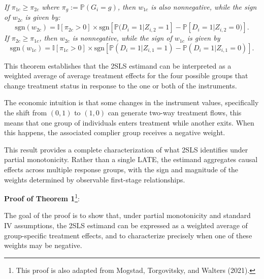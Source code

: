 \documentclass[
  12pt,
  a4paper,
  oneside]{article}
\begin{document}
\textit{If $\pi_{1c} \ge \pi_{2c}$ where $\pi_g := \mathbb{P}(G_i = g)$, then $w_{1c}$ is also nonnegative, while the sign of $w_{2c}$ is given by:}
\begin{equation}
\text{sgn}(w_{2c}) = \mathbb{I}[\pi_{2c} > 0] \times \text{sgn}[\mathbb{P}(D_i = 1 | Z_{i,2} = 1] - \mathbb{P}[D_i = 1 | Z_{i,2} = 0)].
\end{equation}
\textit{If $\pi_{2c} \ge \pi_{1c}$, then $w_{2c}$ is nonnegative, while the sign of $w_{1c}$ is given by}
\begin{equation}
\text{sgn}(w_{1c}) = \mathbb{I}[\pi_{1c} > 0] \times \text{sgn}[\mathbb{P}(D_i = 1 | Z_{i,1} = 1) - \mathbb{P}(D_i = 1 | Z_{i,1} = 0)].
\end{equation}

This theorem establishes that the 2SLS estimand can be interpreted as a
weighted average of average treatment effects for the four possible
groups that change treatment status in response to the one or both of
the instruments.

The economic intuition is that some changes in the instrument values,
specifically the shift from \((0,1)\) to \((1,0)\) can generate two-way
treatment flows, this means that one group of individuals enters
treatment while another exits. When this happens, the associated
complier group receives a negative weight.

This result provides a complete characterization of what 2SLS identifies
under partial monotonicity. Rather than a single LATE, the estimand
aggregates causal effects across multiple response groups, with the sign
and magnitude of the weights determined by observable first-stage
relationships.

\textbf{Proof of Theorem 1}\footnote{This proof is also adapted from
  Mogstad, Torgovitsky, and Walters (2021).}:

The goal of the proof is to show that, under partial monotonicity and
standard IV assumptions, the 2SLS estimand can be expressed as a
weighted average of group-specific treatment effects, and to
characterize precisely when one of these weights may be negative.
\end{document}
